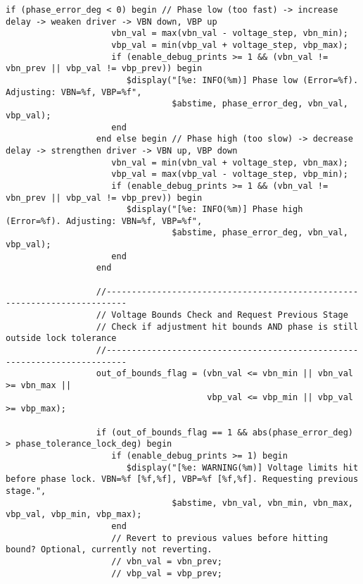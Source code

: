 \begin{lstlisting}[caption={Verilog-A Generic Vb Tuner Implementation}]
                  if (phase_error_deg < 0) begin // Phase low (too fast) -> increase delay -> weaken driver -> VBN down, VBP up
                     vbn_val = max(vbn_val - voltage_step, vbn_min);
                     vbp_val = min(vbp_val + voltage_step, vbp_max);
                     if (enable_debug_prints >= 1 && (vbn_val != vbn_prev || vbp_val != vbp_prev)) begin
                        $display("[%e: INFO(%m)] Phase low (Error=%f). Adjusting: VBN=%f, VBP=%f",
                                 $abstime, phase_error_deg, vbn_val, vbp_val);
                     end
                  end else begin // Phase high (too slow) -> decrease delay -> strengthen driver -> VBN up, VBP down
                     vbn_val = min(vbn_val + voltage_step, vbn_max);
                     vbp_val = max(vbp_val - voltage_step, vbp_min);
                     if (enable_debug_prints >= 1 && (vbn_val != vbn_prev || vbp_val != vbp_prev)) begin
                        $display("[%e: INFO(%m)] Phase high (Error=%f). Adjusting: VBN=%f, VBP=%f",
                                 $abstime, phase_error_deg, vbn_val, vbp_val);
                     end
                  end

                  //--------------------------------------------------------------------------
                  // Voltage Bounds Check and Request Previous Stage
                  // Check if adjustment hit bounds AND phase is still outside lock tolerance
                  //--------------------------------------------------------------------------
                  out_of_bounds_flag = (vbn_val <= vbn_min || vbn_val >= vbn_max ||
                                        vbp_val <= vbp_min || vbp_val >= vbp_max);

                  if (out_of_bounds_flag == 1 && abs(phase_error_deg) > phase_tolerance_lock_deg) begin
                     if (enable_debug_prints >= 1) begin
                        $display("[%e: WARNING(%m)] Voltage limits hit before phase lock. VBN=%f [%f,%f], VBP=%f [%f,%f]. Requesting previous stage.",
                                 $abstime, vbn_val, vbn_min, vbn_max, vbp_val, vbp_min, vbp_max);
                     end
                     // Revert to previous values before hitting bound? Optional, currently not reverting.
                     // vbn_val = vbn_prev;
                     // vbp_val = vbp_prev;


\end{lstlisting}
